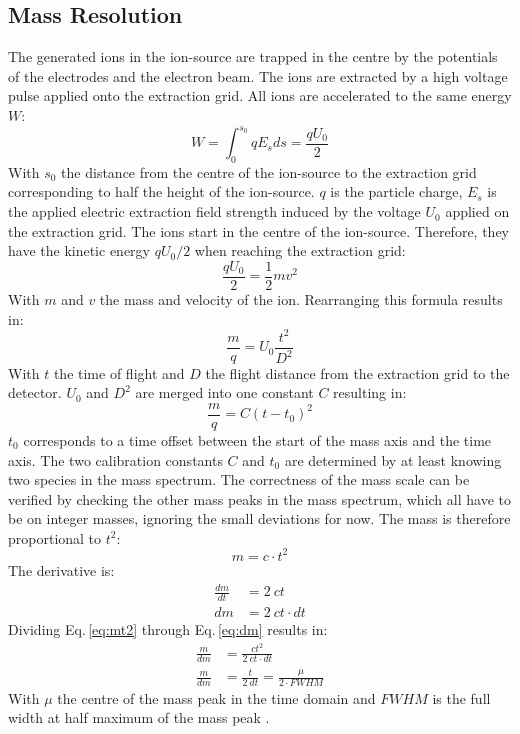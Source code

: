 	\subsection{Mass Resolution }\label{chap:massRes}
	The generated ions in the ion-source are trapped in the centre by the potentials of the electrodes and the electron beam. The ions are extracted by a high voltage pulse applied onto the extraction grid. All ions are accelerated to the same energy $W$:
	\begin{equation}
		W = \int_{0}^{s_0}q E_s ds =  \frac{q U_0}{2}
		\label{eq:WIonPulse}
	\end{equation}
	With $s_0$ the distance from the centre of the ion-source to the extraction grid corresponding to half the height of the ion-source. $q$ is the particle charge, $E_s$ is the applied electric extraction field strength induced by the voltage $U_0$ applied on the extraction grid. The ions start in the centre of the ion-source. Therefore, they have the kinetic energy $q U_0/2$ when reaching the extraction grid:
	\begin{equation}
		\frac{q U_0}{2} = \frac{1}{2}m v^2
	\end{equation}
	With $m$ and $v$ the mass and velocity of the ion. Rearranging this formula results in:
	\begin{equation}
		\frac{m}{q} = U_0\frac{t^2}{D^2}
		\label{eq:m/q}
	\end{equation}
	With $t$ the time of flight and $D$ the flight distance from the extraction grid to the detector. $U_0$ and $D^2$ are merged into one constant $C$ resulting in:
	\begin{equation}
		\frac{m}{q} = C(t-t_0)^2
		\label{eq:mass_Calib}
	\end{equation}
	$t_0$ corresponds to a time offset between the start of the mass axis and the time axis. The two calibration constants $C$ and $t_0$ are determined by at least knowing two species in the mass spectrum. The correctness of the mass scale can be verified by checking the other mass peaks in the mass spectrum, which all have to be on integer masses, ignoring the small deviations for now. The mass is therefore proportional to $t^2$:
	\begin{equation}
		m = c\cdot t^2
		\label{eq:mt2}
	\end{equation}
	The derivative is:
	\begin{align}
		\frac{dm}{dt} &= 2~ct\\
		dm &= 2~ct\cdot dt
		\label{eq:dm}
	\end{align}
	Dividing Eq.\,\eqref{eq:mt2} through Eq.\,\eqref{eq:dm} results in:
	\begin{align}
		\frac{m}{dm} &= \frac{ct^2}{2~ct\cdot dt}\\
		\frac{m}{dm} &= \frac{t}{2~dt} = \frac{\mu}{2\cdot FWHM}
		\label{eq:massRes}
	\end{align}
	With $\mu$ the centre of the mass peak in the time domain and $FWHM$ is the full width at half maximum of the mass peak \cite{LecNot_Wurz2017}.\\
	
